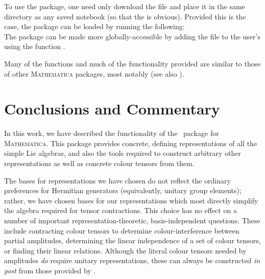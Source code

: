 \documentclass[12pt,a4paper]{article}\let\ifpdf\relax
\begin{document}
To use the package, one need only download the \rpackage{} file and place it in the same directory as any saved notebook (so that the  is obvious). Provided this is the case, the package can be loaded by running the following: 
%
\\
%
The package can be made more globally-accessible by adding the \rpackage{} file to the user's  using the function .

Many of the functions and much of the functionality provided are similar to those of other \textsc{Mathematica} packages, most notably \cite{Bourjaily:2023uln} (see also \cite{Bourjaily:2010wh,Bourjaily:2012gy,Bourjaily:2013mma,Bourjaily:2015jna,Bourjaily:2026adf}).



\newpage
\section{Conclusions and Commentary}\label{sec:conclusion}\vspace{-4pt}

In this work, we have described the functionality of the \rpackage~package for \textsc{Mathematica}. This package provides concrete, defining representations of all the simple Lie algebras, and also the tools required to construct arbitrary other representations as well as concrete colour tensors from them. 

The bases for representations we have chosen do not reflect the ordinary preferences for Hermitian generators (equivalently, unitary group elements); rather, we have chosen bases for our representations which most directly simplify the algebra required for tensor contractions. This choice has no effect on a number of important representation-theoretic, basis-independent questions. These include contracting colour tensors to determine colour-interference between partial amplitudes, determining the linear independence of a set of colour tensors, or finding their linear relations. Although the literal colour tensors needed by amplitudes \emph{do} require unitary representations, these can always be constructed \emph{in post} from those provided by \rpackage. 
\end{document}
